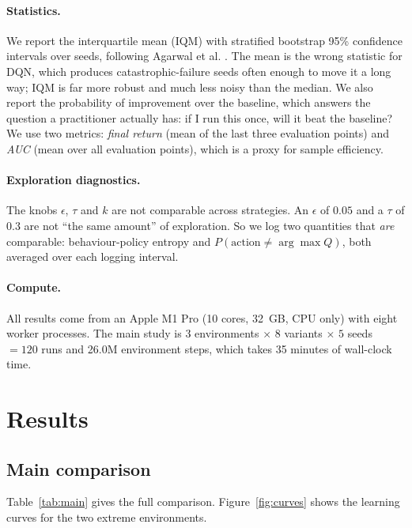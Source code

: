 \documentclass[11pt,a4paper]{article}
\begin{document}
\paragraph{Statistics.}
We report the interquartile mean (IQM) with stratified bootstrap 95\%
confidence intervals over seeds, following Agarwal et al. \cite{agarwal2021}.
The mean is the wrong statistic for DQN, which produces catastrophic-failure
seeds often enough to move it a long way; IQM is far more robust and much less
noisy than the median. We also report the probability of improvement over the
baseline, which answers the question a practitioner actually has: if I run this
once, will it beat the baseline? We use two metrics: \emph{final return}
(mean of the last three evaluation points) and \emph{AUC} (mean over all
evaluation points), which is a proxy for sample efficiency.

\paragraph{Exploration diagnostics.}
The knobs $\epsilon$, $\tau$ and $k$ are not comparable across strategies. An
$\epsilon$ of $0.05$ and a $\tau$ of $0.3$ are not ``the same amount'' of
exploration. So we log two quantities that \emph{are} comparable:
behaviour-policy entropy and $P(\text{action} \neq \arg\max Q)$, both averaged
over each logging interval.

\paragraph{Compute.}
All results come from an Apple M1 Pro (10 cores, 32~GB, CPU only) with eight
worker processes. The main study is $3$ environments $\times$ $8$ variants
$\times$ $5$ seeds $= 120$ runs and 26.0M environment steps, which takes 35
minutes of wall-clock time.

\section{Results}
\label{sec:results}

\subsection{Main comparison}
\label{sec:res-main}

Table~\ref{tab:main} gives the full comparison. Figure~\ref{fig:curves} shows
the learning curves for the two extreme environments.
\end{document}
